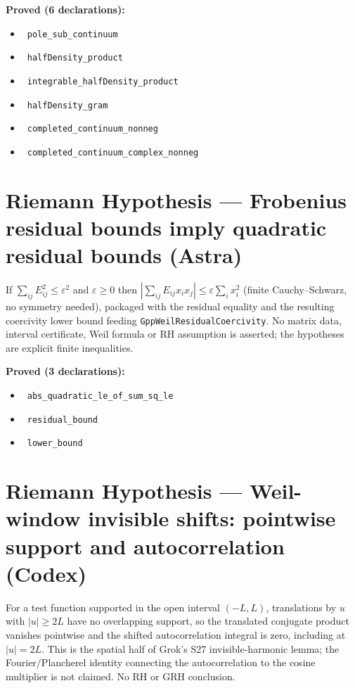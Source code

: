 \documentclass{report}
\theoremstyle{definition}
\begin{document}
\begin{itemize}
\noindent\textbf{Proved (6 declarations):}
\begin{itemize}
  \item {}\leanok\ \texttt{pole\_sub\_continuum}
  \item {}\leanok\ \texttt{halfDensity\_product}
  \item {}\leanok\ \texttt{integrable\_halfDensity\_product}
  \item {}\leanok\ \texttt{halfDensity\_gram}
  \item {}\leanok\ \texttt{completed\_continuum\_nonneg}
  \item {}\leanok\ \texttt{completed\_continuum\_complex\_nonneg}
\end{itemize}

\section{Riemann Hypothesis --- Frobenius residual bounds imply quadratic residual bounds (Astra)}
If $\sum_{ij}E_{ij}^2\le\varepsilon^2$ and $\varepsilon\ge0$ then $|\sum_{ij}E_{ij}x_ix_j|\le\varepsilon\sum_ix_i^2$ (finite Cauchy--Schwarz, no symmetry needed), packaged with the residual equality and the resulting coercivity lower bound feeding \texttt{GppWeilResidualCoercivity}. No matrix data, interval certificate, Weil formula or RH assumption is asserted; the hypotheses are explicit finite inequalities.

\noindent\textbf{Proved (3 declarations):}
\begin{itemize}
  \item {}\leanok\ \texttt{abs\_quadratic\_le\_of\_sum\_sq\_le}
  \item {}\leanok\ \texttt{residual\_bound}
  \item {}\leanok\ \texttt{lower\_bound}
\end{itemize}

\section{Riemann Hypothesis --- Weil-window invisible shifts: pointwise support and autocorrelation (Codex)}
For a test function supported in the open interval $(-L,L)$, translations by $u$ with $|u|\ge2L$ have no overlapping support, so the translated conjugate product vanishes pointwise and the shifted autocorrelation integral is zero, including at $|u|=2L$. This is the spatial half of Grok's S27 invisible-harmonic lemma; the Fourier/Plancherel identity connecting the autocorrelation to the cosine multiplier is not claimed. No RH or GRH conclusion.


\end{itemize}
\end{document}
